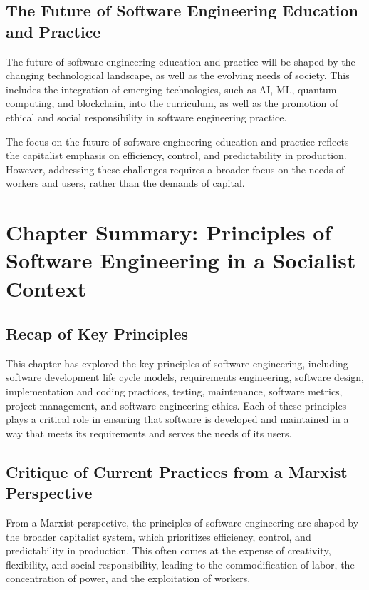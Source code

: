 \begin{refsection}
\begin{multicols}{2}
{\subsection{The Future of Software Engineering Education and Practice}

The future of software engineering education and practice will be shaped by the changing technological landscape, as well as the evolving needs of society. This includes the integration of emerging technologies, such as AI, ML, quantum computing, and blockchain, into the curriculum, as well as the promotion of ethical and social responsibility in software engineering practice.

The focus on the future of software engineering education and practice reflects the capitalist emphasis on efficiency, control, and predictability in production. However, addressing these challenges requires a broader focus on the needs of workers and users, rather than the demands of capital.

}
\end{multicols}
\newpage

\section{Chapter Summary: Principles of Software Engineering in a Socialist Context}
\begin{multicols}{2}
{\small

\subsection{Recap of Key Principles}

This chapter has explored the key principles of software engineering, including software development life cycle models, requirements engineering, software design, implementation and coding practices, testing, maintenance, software metrics, project management, and software engineering ethics. Each of these principles plays a critical role in ensuring that software is developed and maintained in a way that meets its requirements and serves the needs of its users.

\subsection{Critique of Current Practices from a Marxist Perspective}

From a Marxist perspective, the principles of software engineering are shaped by the broader capitalist system, which prioritizes efficiency, control, and predictability in production. This often comes at the expense of creativity, flexibility, and social responsibility, leading to the commodification of labor, the concentration of power, and the exploitation of workers.

}
\end{multicols}
\end{refsection}
